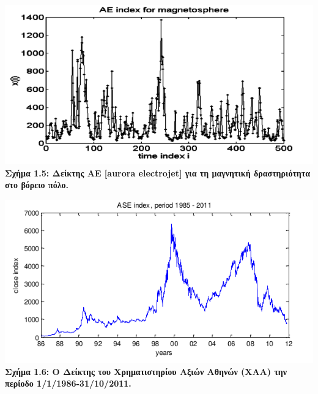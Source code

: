 \begin{center}
\includegraphics[scale=0.5]{graf5_5.png}\\
\textbf{Σχήμα 1.5: Δείκτης ΑΕ [aurora electrojet] για τη μαγνητική δραστηριότητα στο βόρειο πόλο. }
\end{center}
\begin{center}
\includegraphics[scale=0.5]{graf5_6.png}\\
\textbf{Σχήμα 1.6: Ο Δείκτης του Χρηματιστηρίου Αξιών Αθηνών (ΧΑΑ) την περίοδο 1/1/1986-31/10/2011. }
\end{center}

